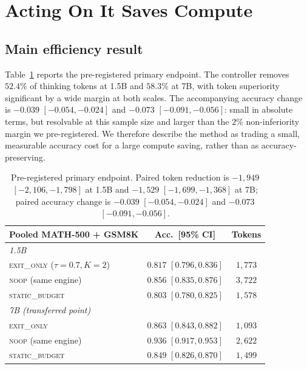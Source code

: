 \section{Acting On It Saves Compute}
\label{sec:acting}

\subsection{Main efficiency result}
\label{sec:main}

Table~\ref{tab:primary} reports the pre-registered primary endpoint. The
controller removes $52.4\%$ of thinking tokens at 1.5B and $58.3\%$ at 7B,
with token superiority significant by a wide margin at both scales. The
accompanying accuracy change is $-0.039$ $[-0.054,-0.024]$ and $-0.073$
$[-0.091,-0.056]$: small in absolute terms, but resolvable at this sample size
and larger than the $2\%$ non-inferiority margin we pre-registered. We
therefore describe the method as trading a small, measurable accuracy cost for
a large compute saving, rather than as accuracy-preserving.

\begin{table}[t]
\centering
\small
\setlength{\tabcolsep}{3pt}
\begin{tabular}{lcc}
\toprule
Pooled MATH-500 + GSM8K & Acc.\ [95\% CI] & Tokens \\
\midrule
\multicolumn{3}{l}{\emph{1.5B}}\\
\textsc{exit\_only} ($\tau{=}0.7,K{=}2$) & $0.817$ $[0.796,0.836]$ & $1{,}773$ \\
\textsc{noop} (same engine) & $0.856$ $[0.835,0.876]$ & $3{,}722$ \\
\textsc{static\_budget} & $0.803$ $[0.780,0.825]$ & $1{,}578$ \\
\midrule
\multicolumn{3}{l}{\emph{7B (transferred point)}}\\
\textsc{exit\_only} & $0.863$ $[0.843,0.882]$ & $1{,}093$ \\
\textsc{noop} (same engine) & $0.936$ $[0.917,0.953]$ & $2{,}622$ \\
\textsc{static\_budget} & $0.849$ $[0.826,0.870]$ & $1{,}499$ \\
\bottomrule
\end{tabular}
\caption{Pre-registered primary endpoint. Paired token reduction is
$-1{,}949$ $[-2{,}106,-1{,}798]$ at 1.5B and $-1{,}529$ $[-1{,}699,-1{,}368]$
at 7B; paired accuracy change is $-0.039$ $[-0.054,-0.024]$ and $-0.073$
$[-0.091,-0.056]$.}
\label{tab:primary}
\end{table}

